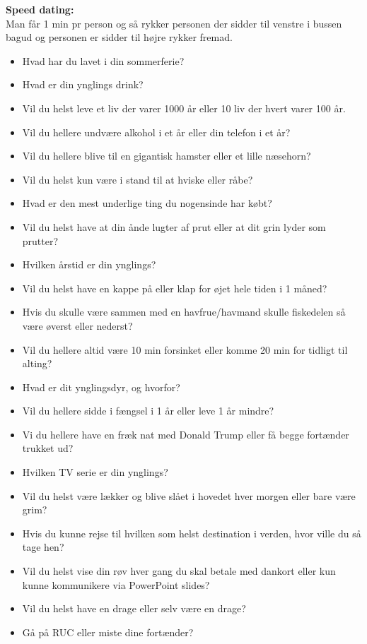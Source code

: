 \documentclass[../../../main.tex]{subfiles}
\begin{document}
\textbf{Speed dating:}\\
Man får 1 min pr person og så rykker personen der sidder til venstre i bussen bagud og personen er sidder til højre rykker fremad. 
\begin{itemize}
    \item Hvad har du lavet i din sommerferie?
    \item Hvad er din ynglings drink?
    \item Vil du helst leve et liv der varer 1000 år eller 10 liv der hvert varer 100 år.
    \item Vil du hellere undvære alkohol i et år eller din telefon i et år? 
    \item Vil du hellere blive til en gigantisk hamster eller et lille næsehorn?
    \item Vil du helst kun være i stand til at hviske eller råbe?
    \item Hvad er den mest underlige ting du nogensinde har købt?
    \item Vil du helst have at din ånde lugter af prut eller at dit grin lyder som prutter?
    \item Hvilken årstid er din ynglings?
    \item Vil du helst have en kappe på eller klap for øjet hele tiden i 1 måned?
    \item Hvis du skulle være sammen med en havfrue/havmand skulle fiskedelen så være øverst eller nederst?
    \item Vil du hellere altid være 10 min forsinket eller komme 20 min for tidligt til alting?
    \item Hvad er dit ynglingsdyr, og hvorfor?
    \item Vil du hellere sidde i fængsel i 1 år eller leve 1 år mindre?
    \item Vi du hellere have en fræk nat med Donald Trump eller få begge fortænder trukket ud?
    \item Hvilken TV serie er din ynglings?
    \item Vil du helst være lækker og blive slået i hovedet hver morgen eller bare være grim?
    \item Hvis du kunne rejse til hvilken som helst destination i verden, hvor ville du så tage hen?
    \item Vil du helst vise din røv hver gang du skal betale med dankort eller kun kunne kommunikere via PowerPoint slides?
    \item Vil du helst have en drage eller selv være en drage?
    \item Gå på RUC eller miste dine fortænder?

\end{itemize}
\end{document}
